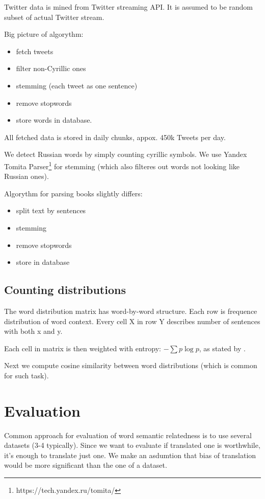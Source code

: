 \documentclass[11pt,letterpaper]{article}
\begin{document}
Twitter data is mined from Twitter streaming API. It is assumed to be random subset of actual Twitter stream.

Big picture of algorythm:
\begin{itemize}
\item fetch tweets
\item filter non-Cyrillic ones
\item stemming (each tweet as one sentence)
\item remove stopwords
\item store words in database.
\end{itemize}

All fetched data is stored in daily chunks, appox. 450k Tweets per day.

We detect Russian words by simply counting cyrillic symbols. We use Yandex Tomita Parser\footnote{https://tech.yandex.ru/tomita/}
for stemming (which also filteres out words not looking like Russian ones).

Algorythm for parsing books slightly differs:
\begin{itemize}
\item split text by sentences
\item stemming
\item remove stopwords
\item store in database
\end{itemize}

\subsection{Counting distributions}

The word distribution matrix has word-by-word structure. 
Each row is frequence distribution of word context. 
Every cell X in row Y describes number of sentences with both x and y.

Each cell in matrix is then weighted with entropy: 
$- \sum p \log p$, as stated by \cite{landauer1998introduction}.

Next we compute cosine similarity between word distributions (which is common for such task).

\section{Evaluation}

Common approach for evaluation of word semantic relatedness is to use several datasets (3-4 typically). 
Since we want to evaluate if translated one is worthwhile, it's enough to translate just one. 
We make an asdumtion that bias of translation would be more significant than the one of a dataset.
\end{document}
